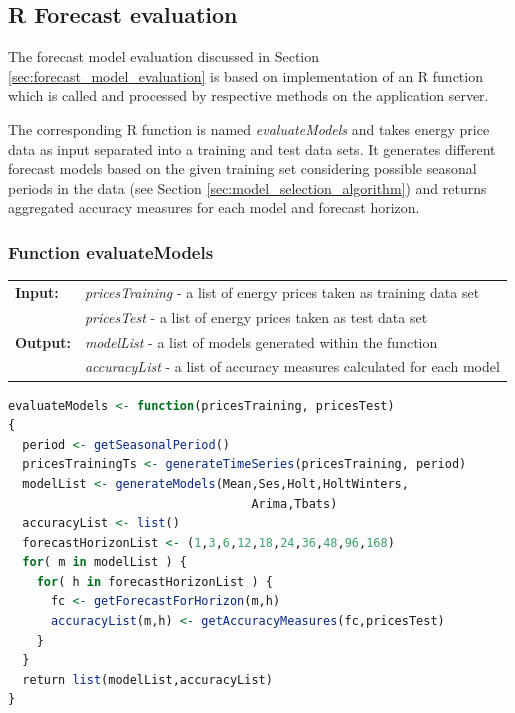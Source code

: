 %





\subsection{R Forecast evaluation}


The forecast model evaluation discussed in Section \ref{sec:forecast_model_evaluation} is based on implementation of an R function which is called and processed by respective methods on the application server. 

The corresponding R function is named \textit{evaluateModels} and takes energy price data as input separated into a training and test data sets. It generates different forecast models based on the given training set considering possible seasonal periods in the data (see Section \ref{sec:model_selection_algorithm}) and returns aggregated accuracy measures for each model and forecast horizon. 

\subsubsection{Function evaluateModels}

\begin{tabular}{ll}
\textbf{Input:}  & \textit{pricesTraining} - a list of energy prices taken as training data set \\
								 & \textit{pricesTest} - a list of energy prices taken as test data set \\
\textbf{Output:} & \textit{modelList} - a list of models generated within the function \\
								 & \textit{accuracyList} - a list of accuracy measures calculated for each model
\end{tabular}


\begin{lstlisting}[language=R, caption=Function evaluateModels, label={lst:evaluateModelsR}]
evaluateModels <- function(pricesTraining, pricesTest)
{
  period <- getSeasonalPeriod()
  pricesTrainingTs <- generateTimeSeries(pricesTraining, period)
  modelList <- generateModels(Mean,Ses,Holt,HoltWinters, 
	                              Arima,Tbats)						
  accuracyList <- list()
  forecastHorizonList <- (1,3,6,12,18,24,36,48,96,168)
  for( m in modelList ) {
    for( h in forecastHorizonList ) {
      fc <- getForecastForHorizon(m,h)
      accuracyList(m,h) <- getAccuracyMeasures(fc,pricesTest)
    }
  }
  return list(modelList,accuracyList)
}
\end{lstlisting}

